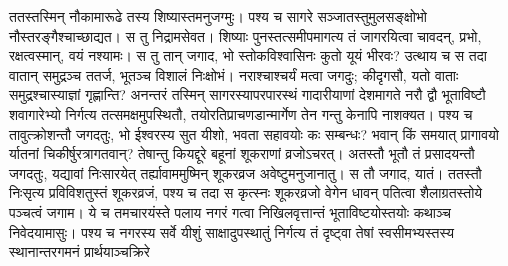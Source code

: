 \vakya ततस्तस्मिन् नौकामारूढे तस्य शिष्यास्तमनुजग्मुः। पश्य च सागरे सञ्जातस्तुमुलसङ्क्षोभो नौस्तरङ्गैश्चाच्छाद्यत।
\vakya स तु निद्रामसेवत।
\vakya शिष्याः पुनस्तत्समीपमागत्य तं जागरयित्वा चावदन्, प्रभो, रक्षत्वस्मान्, वयं नश्यामः।
\vakya स तु तान् जगाद, भो स्तोकविश्वासिनः कुतो यूयं भीरवः? उत्थाय च स तदा वातान् समुद्रञ्च ततर्ज, भूतञ्च विशालं निःक्षोभं।
\vakya नराश्चाश्चर्यं मत्वा जगदुः; कीदृगसौ, यतो वाताः समुद्रश्चास्याज्ञां गृह्णान्ति?
\vakya अनन्तरं तस्मिन् सागरस्यापरपारस्थं गादारीयाणां देशमागते नरौ द्वौ भूताविष्टौ शवागारेभ्यो निर्गत्य तत्समक्षमुपस्थितौ, तयोरतिप्राचणडान्मार्गेण तेन गन्तु केनापि नाशक्यत।
\vakya पश्य च तावुत्क्रोशन्तौ जगदतुः, भो ईश्वरस्य सुत यीशो, भवता सहावयोः कः सम्बन्धः? भवान् किं समयात् प्रागावयो र्यातनां चिकीर्षुरत्रागतवान्?
\vakya तेषान्तु कियद्दूरे बहूनां शूकराणां व्रजोऽचरत्।
\vakya अतस्तौ भूतौ तं प्रसादयन्तौ जगदतुः, यद्यावां निःसारयेत् तर्ह्यावाममुष्मिन् शूकरव्रज अवेष्टुमनुजानातु।
\vakya स तौ जगाद, यातं। ततस्तौ निःसृत्य प्रविविशतुस्तं शूकरव्रजं, पश्य च तदा स कृत्स्नः शूकरव्रजो वेगेन धावन् पतित्वा शैलाग्रतस्तोये पञ्चत्वं जगाम।
\vakya ये च तमचारयंस्ते पलाय नगरं गत्वा निखिलवृत्तान्तं भूताविष्टयोस्तयोः कथाञ्च निवेदयामासुः।
\vakya पश्य च नगरस्य सर्वे यीशुं साक्षादुपस्थातुं निर्गत्य तं दृष्ट्वा तेषां स्वसीमभ्यस्तस्य स्थानान्तरगमनं प्रार्थयाञ्चक्रिरे\eoc